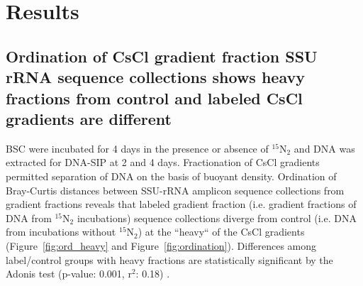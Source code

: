 \section{Results}
\subsection{Ordination of CsCl gradient fraction SSU rRNA sequence collections
shows heavy fractions from control and labeled CsCl gradients are
different} 
BSC were incubated for 4 days in the presence or absence of $^{15}$N$_{2}$ and
DNA was extracted for DNA-SIP at 2 and 4 days. Fractionation of CsCl gradients
permitted separation of DNA on the basis of buoyant density. Ordination of
Bray-Curtis \citep{Bray_1957} distances between SSU-rRNA amplicon sequence
collections from gradient fractions reveals that labeled gradient fraction
(i.e. gradient fractions of DNA from $^{15}$N$_{2}$ incubations) sequence
collections diverge from control (i.e. DNA from incubations without
$^{15}$N$_{2}$) at the ``heavy`` of the CsCl gradients
(Figure~\ref{fig:ord_heavy} and Figure~\ref{fig:ordination}). Differences among
label/control groups with heavy fractions are statistically significant by the
Adonis test (p-value: 0.001, r$^{2}$: 0.18) \citep{Anderson_2001}. 
